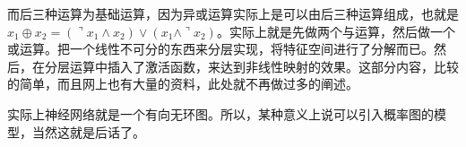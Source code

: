\documentclass[a4paper]{article}
\begin{document}
而后三种运算为基础运算，因为异或运算实际上是可以由后三种运算组成，也就是$x_1\oplus x_2 = (\urcorner x_1 \wedge x_2) \vee (x_1 \wedge \urcorner x_2) $。实际上就是先做两个与运算，然后做一个或运算。把一个线性不可分的东西来分层实现，将特征空间进行了分解而已。然后，在分层运算中插入了激活函数，来达到非线性映射的效果。这部分内容，比较的简单，而且网上也有大量的资料，此处就不再做过多的阐述。

实际上神经网络就是一个有向无环图。所以，某种意义上说可以引入概率图的模型，当然这就是后话了。
\end{document}
